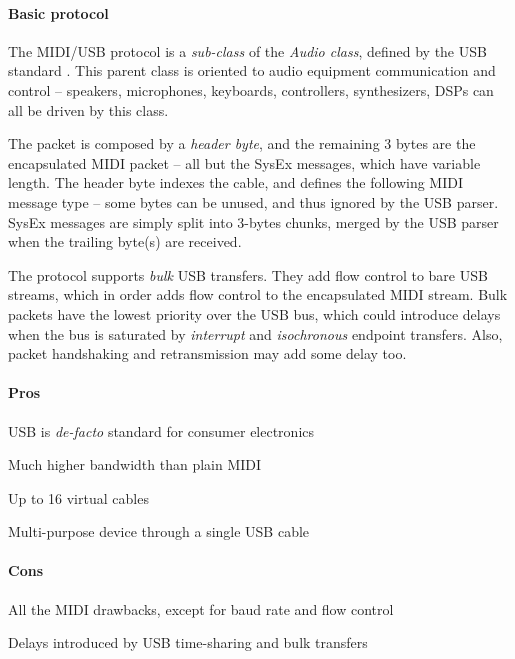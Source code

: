 \documentclass[a4paper,10pt]{article}
\begin{document}
\begin{multicols}{2}
\paragraph{Basic protocol}
The MIDI/USB protocol is a \emph{sub-class} of the \emph{Audio class}, defined
by the USB standard \CITEME. This parent class is oriented to audio equipment
communication and control -- speakers, microphones, keyboards, controllers,
synthesizers, DSPs can all be driven by this class.

The packet is composed by a \emph{header byte}, and the remaining 3 bytes are
the encapsulated MIDI packet -- all but the SysEx messages, which have variable
length. The header byte indexes the cable, and defines the following MIDI
message type -- some bytes can be unused, and thus ignored by the USB parser.
SysEx messages are simply split into 3-bytes chunks, merged by the USB parser
when the trailing byte(s) are received.

The protocol supports \emph{bulk} USB transfers. They add flow control to bare
USB streams, which in order adds flow control to the encapsulated MIDI stream.
Bulk packets have the lowest priority over the USB bus, which could introduce
delays when the bus is saturated by \emph{interrupt} and \emph{isochronous}
endpoint transfers. Also, packet handshaking and retransmission may add
some delay too.


\paragraph{Pros}
\begin{itemize*}
	\item USB is \emph{de-facto} standard for consumer electronics
	\item Much higher bandwidth than plain MIDI
	\item Up to 16 virtual cables
	\item Multi-purpose device through a single USB cable
\end{itemize*}


\paragraph{Cons}
\begin{itemize*}
	\item All the MIDI drawbacks, except for baud rate and flow control
	\item Delays introduced by USB time-sharing and bulk transfers
\end{itemize*}



\end{multicols}
\end{document}
